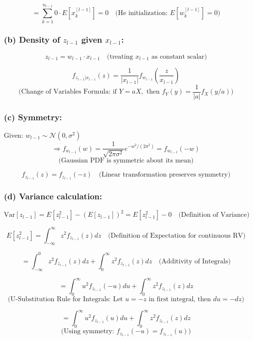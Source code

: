 \documentclass[
  letterpaper,
  DIV=11,
  numbers=noendperiod]{scrartcl}
\begin{document}
\[= \sum_{k=1}^{n_{l-1}} 0 \cdot E[x_k^{[l-1]}] = 0 \quad \text{(He initialization: } E[w_k^{[l-1]}] = 0)\]

\subsubsection{\texorpdfstring{(b) Density of \(z_{l-1}\) given
\(x_{l-1}\):}{(b) Density of z\_\{l-1\} given x\_\{l-1\}:}}\label{b-density-of-z_l-1-given-x_l-1}

\[z_{l-1} = w_{l-1} \cdot x_{l-1} \quad \text{(treating } x_{l-1} \text{ as constant scalar)}\]

\[f_{z_{l-1}|x_{l-1}}(z) = \frac{1}{|x_{l-1}|} f_{w_{l-1}}\left(\frac{z}{x_{l-1}}\right)\]
\[\text{(Change of Variables Formula: if } Y = aX, \text{ then } f_Y(y) = \frac{1}{|a|}f_X(y/a))\]

\subsubsection{(c) Symmetry:}\label{c-symmetry}

Given: \(w_{l-1} \sim \mathcal{N}(0, \sigma^2)\)
\[\Rightarrow f_{w_{l-1}}(w) = \frac{1}{\sqrt{2\pi\sigma^2}} e^{-w^2/(2\sigma^2)} = f_{w_{l-1}}(-w)\]
\[\text{(Gaussian PDF is symmetric about its mean)}\]

\[f_{z_{l-1}}(z) = f_{z_{l-1}}(-z) \quad \text{(Linear transformation preserves symmetry)}\]

\subsubsection{(d) Variance calculation:}\label{d-variance-calculation}

\[\text{Var}[z_{l-1}] = E[z_{l-1}^2] - (E[z_{l-1}])^2 = E[z_{l-1}^2] - 0 \quad \text{(Definition of Variance)}\]

\[E[z_{l-1}^2] = \int_{-\infty}^{\infty} z^2 f_{z_{l-1}}(z) dz \quad \text{(Definition of Expectation for continuous RV)}\]

\[= \int_{-\infty}^{0} z^2 f_{z_{l-1}}(z) dz + \int_{0}^{\infty} z^2 f_{z_{l-1}}(z) dz \quad \text{(Additivity of Integrals)}\]

\[= \int_{0}^{\infty} u^2 f_{z_{l-1}}(-u) du + \int_{0}^{\infty} z^2 f_{z_{l-1}}(z) dz\]
\[\text{(U-Substitution Rule for Integrals: Let $u = -z$ in first integral, then $du = -dz$)}\]

\[= \int_{0}^{\infty} u^2 f_{z_{l-1}}(u) du + \int_{0}^{\infty} z^2 f_{z_{l-1}}(z) dz\]
\[\text{(Using symmetry: } f_{z_{l-1}}(-u) = f_{z_{l-1}}(u))\]
\end{document}
